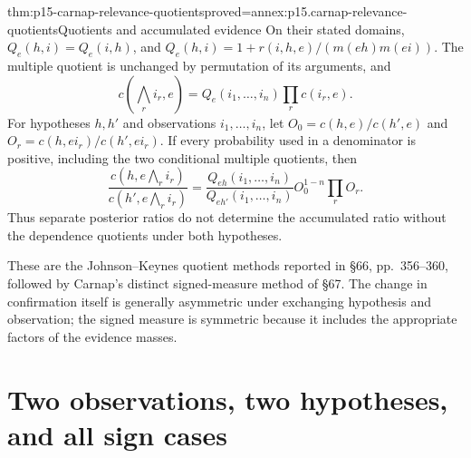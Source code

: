 \begin{hbtheorem}{thm:p15-carnap-relevance-quotients}{proved=annex:p15.carnap-relevance-quotients}{Quotients and accumulated evidence}
On their stated domains, \(Q_e(h,i)=Q_e(i,h)\), and
\(Q_e(h,i)=1+r(i,h,e)/(m(eh)m(ei))\). The multiple quotient is
unchanged by permutation of its arguments, and
\[
 c(\bigwedge_r i_r,e)=Q_e(i_1,\ldots,i_n)\prod_r c(i_r,e).
\]
For hypotheses \(h,h'\) and observations \(i_1,\ldots,i_n\),
let \(O_0=c(h,e)/c(h',e)\) and
\(O_r=c(h,ei_r)/c(h',ei_r)\). If every probability used in a
denominator is positive, including the two conditional multiple
quotients, then
\[
 \frac{c(h,e\bigwedge_r i_r)}{c(h',e\bigwedge_r i_r)}
 =\frac{Q_{eh}(i_1,\ldots,i_n)}{Q_{eh'}(i_1,\ldots,i_n)}
   O_0^{1-n}\prod_r O_r.
\]
Thus separate posterior ratios do not determine the accumulated ratio
without the dependence quotients under both hypotheses.
\end{hbtheorem}

These are the Johnson--Keynes quotient methods reported in §66,
pp.~356--360, followed by Carnap's distinct signed-measure method of
§67. The change in confirmation itself is generally asymmetric under
exchanging hypothesis and observation; the signed measure is symmetric
because it includes the appropriate factors of the evidence masses.

\section{Two observations, two hypotheses, and all sign cases}
\label{sec:p15-carnap-relevance-cases}

